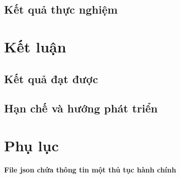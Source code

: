 \documentclass[a4paper, 12pt, openany]{book}
\begin{document}
\section{Kết quả thực nghiệm}

\chapter{Kết luận}
\section{Kết quả đạt được}

\section{Hạn chế và hướng phát triển}

\printbibliography

\chapter*{Phụ lục}

\textbf{File json chứa thông tin một thủ tục hành chính}
\end{document}
